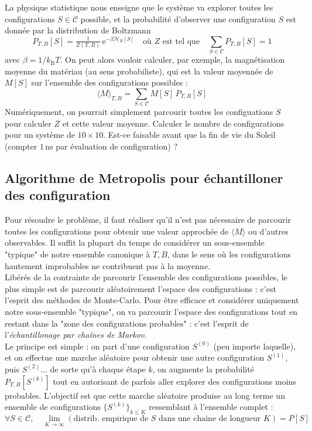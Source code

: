 \documentclass{book}
\begin{document}
La physique statistique nous enseigne que le système va explorer toutes les configurations $S\in\mathcal{C}$ possible, et la probabilité d'observer une configuration $S$ est donnée par la distribution de Boltzmann
\begin{equation}
P_{T,B}[S]=\tfrac{1}{Z({T,B})}\,\mathrm{e}^{-\beta \mathcal{H}_B[S]} \quad \text{où $Z$ est tel que} \quad \sum_{S\in\mathcal{C}}P_{T,B}[S] = 1
\end{equation}
avec $\beta=1/k_\mathrm{B}T$. On peut alors vouloir calculer, par exemple, la magnétisation moyenne du matériau (au sens probabiliste), qui est la valeur moyennée de $M[S]$ sur l’ensemble des configurations possibles :
\begin{equation}
\langle M\rangle_{T,B} = \sum_{S\in\mathcal{C}} M[S]\,P_{T,B}[S]
\end{equation}
Numériquement, on pourrait simplement parcourir toutes les configuations $S$ pour calculer $Z$ et cette valeur moyenne. Calculer le nombre de configurations pour un système de $10\times 10$. Est-ce faisable avant que la fin de vie du Soleil (compter $1\,\mathrm{ns}$ par évaluation de configuration) ?

\subsection{Algorithme de Metropolis pour échantilloner des configuration}

Pour résoudre le problème, il faut réaliser qu'il n'est pas nécessaire de parcourir toutes les configurations pour obtenir une valeur approchée de $\langle M\rangle$ ou d'autres observables. Il suffit la plupart du temps de considérer un sous-ensemble "typique" de notre ensemble canonique à $T,B$, dans le sens où les configurations hautement improbables ne contribuent pas à la moyenne.\\

Libérés de la contrainte de parcourir l’ensemble des configurations possibles, le plus simple est de parcourir aléatoirement l'espace des configurations : c'est l'esprit des méthodes de Monte-Carlo. Pour être efficace et considérer uniquement notre sous-ensemble "typique", on va parcourir l'espace des configurations tout en restant dans la "zone des configurations probables" : c'est l'esprit de l'\emph{échantillonage par chaînes de Markov}.\\

Le principe est simple : on part d'une configuration $S^{(0)}$ (peu importe laquelle), et on effectue une marche aléatoire pour obtenir une autre configuration $S^{(1)}$, puis $S^{(2)}$... de sorte qu'à chaque étape $k$, on augmente la probabilité $P_{T,B}[S^{(k)}]$ tout en autorisant de parfois aller explorer des configurations moins probables. L'objectif est que cette marche aléatoire produise au long terme un ensemble de configurations $\{ S^{(k)} \}_{k\leq K}$ ressemblant à l'ensemble complet :
\begin{equation}
\forall S\in\mathcal{C},\quad\lim_{K\to\infty} (\text{distrib. empirique de $S$ dans une chaine de longueur $K$}) = P[S] \label{eq:convergence-proba}
\end{equation}
\end{document}
